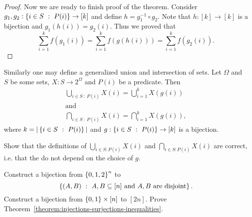 \begin{proof}
  Now we are ready to finish proof of the theorem.
  Consider $g_1, g_2 : \set[P(i)]{i \in S} \to [k]$ and define
  $h = g_1^{-1} \circ g_2$. Note that $h : [k] \to [k]$ is a bijection and
  $g_1(h(i)) = g_2(i)$. Thus we proved that
  \[
    \sum_{i = 1}^k f(g_1(i)) = \sum_{i = 1}^k f(g(h(i))) =
    \sum_{i = 1}^k f(g_2(i)).
  \]
\end{proof}

Similarly one may define a generalized union and intersection of sets.
Let $\Omega$ and $S$ be some sets, $X : S \to 2^\Omega$ and $P(i)$ be a
predicate. Then
\begin{gather*}
  \bigcup_{i \in S ~:~ P(i)} X(i) = \bigcup_{i = 1}^k X(g(i)) \\
  \text{and}\\
  \bigcap_{i \in S ~:~ P(i)} X(i) = \bigcap_{i = 1}^k X(g(i)),
\end{gather*}
where $k = |\set[P(i)]{i \in S}|$ and $g : \set[P(i)]{i \in S} \to [k]$ is a
bijection.

\begin{exercise}
  Show that the definitions of $\bigcup_{i \in S : P(i)} X(i)$ and
  $\bigcap_{i \in S : P(i)} X(i)$ are correct,
  i.e. that the do not depend on the choice of $g$.
\end{exercise}


\begin{chapterendexercises}
  \exercise Construct a bijection from $\set{0, 1, 2}^n$ to
    \[
      \set[{A, B \subseteq [n] \text{ and } A, B \text{ are disjoint}}]{(A, B)}.
    \]
  \exercise Construct a bijection from $\set{0, 1} \times [n]$ to $[2n]$.
  \exercise Prove Theorem~\ref{theorem:injections-surjections-inequalities}.
\end{chapterendexercises}
